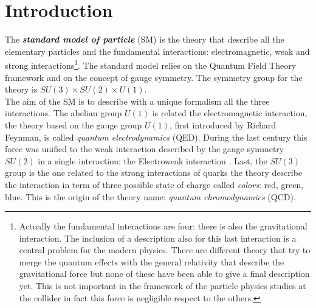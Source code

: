 %
%

\chapter{Introduction}

\setcounter{page}{1}

	The \textbf{\emph{standard model of particle}} (SM) is the theory that describe all the elementary particles and the fundamental interactions: electromagnetic, weak and strong interactions\footnote{Actually the fundamental interactions are four: there is also the gravitational interaction. The inclusion of a description also for this last interaction is a central problem for the modern physics. There are different theory that try to merge the quantum effects with the general relativity that describe the gravitational force but none of these have been able to give a final description yet. This is not important in the framework of the particle physics studies at the collider in fact this force is negligible respect to the others.  }. The standard model relies on the Quantum Field Theory framework and on the concept of gauge symmetry. The symmetry group for the theory is $SU(3)\times SU(2)\times U(1)$. 
\\
The aim of the SM is to describe with a unique formalism all the three interactions. The abelian group $U(1)$ is related the electromagnetic interaction, the theory based on the gauge group $U(1)$, first introduced by Richard Feynman, is called \textit{quantum electrodynamics} (QED). During the last century this force was unified to the weak interaction described by the gauge symmetry $SU(2)$ in a single interaction: the Electroweak interaction \cite{PhysRevLett.19.1264}. Last, the $SU(3)$ group is the one related to the strong interactions of quarks the theory describe the interaction in term of three possible state of charge called \textit{colors}: red, green, blue. This is the origin of the theory name: \textit{quantum chromodynamics} (QCD). 
